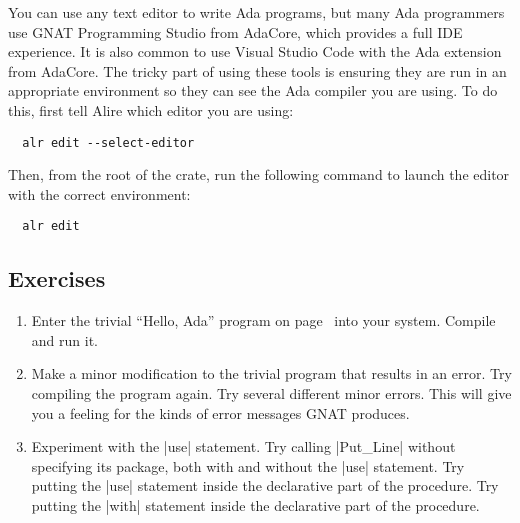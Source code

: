 You can use any text editor to write Ada programs, but many Ada programmers use GNAT Programming
Studio from AdaCore, which provides a full IDE experience. It is also common to use Visual
Studio Code with the Ada extension from AdaCore. The tricky part of using these tools is
ensuring they are run in an appropriate environment so they can see the Ada compiler you are
using. To do this, first tell Alire which editor you are using:

\begin{Verbatim}
  alr edit --select-editor
\end{Verbatim}

\noindent Then, from the root of the crate, run the following command to launch the editor with
the correct environment:

\begin{Verbatim}
  alr edit
\end{Verbatim}

\subsection*{Exercises}

\begin{enumerate}
\item Enter the trivial ``Hello, Ada'' program on page~\pageref{lst:hello-ada} into your system.
  Compile and run it.

\item Make a minor modification to the trivial program that results in an error. Try compiling
  the program again. Try several different minor errors. This will give you a feeling for the
  kinds of error messages GNAT produces.

\item Experiment with the |use| statement. Try calling |Put_Line| without specifying its
  package, both with and without the |use| statement. Try putting the |use| statement inside the
  declarative part of the procedure. Try putting the |with| statement inside the declarative
  part of the procedure.
\end{enumerate}

